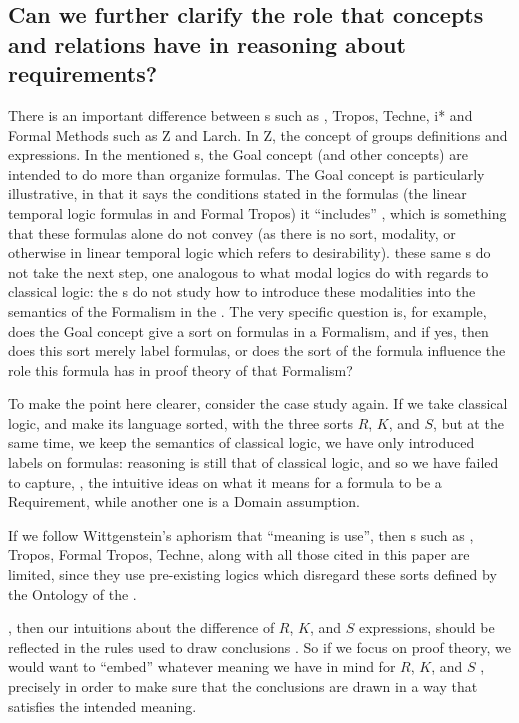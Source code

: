 \documentclass[10pt, final, conference, compsocconf]{IEEEtran}
\begin{document}
\subsection{Can we further clarify the role that concepts and relations have in reasoning about requirements?}\label{s:challenges:meaning-is-use}
There is an important difference between s such as , Tropos, Techne, i* and Formal Methods such as Z and Larch. In Z, the concept of  groups definitions and expressions. In the mentioned s, the Goal concept (and other concepts) are intended to do more than organize formulas. The Goal concept is particularly illustrative, in that it says the conditions stated in the formulas (the linear temporal logic formulas in  and Formal Tropos) it ``includes'' , which is something that these formulas alone do not convey (as there is no sort, modality, or otherwise in linear temporal logic which refers to desirability).  these same s do not take the next step, one analogous to what modal logics do with regards to classical logic: the s do not study how to introduce these modalities into the semantics of the Formalism in the . The very specific question is, for example, does the Goal concept give a sort on formulas in a Formalism, and if yes, then does this sort merely label formulas, or does the sort of the formula influence the role this formula has in proof theory of that Formalism? 

To make the point here clearer, consider the case study again. If we take classical logic, and make its language sorted, with the three sorts $R$, $K$, and $S$, but at the same time, we keep the semantics of classical logic, we have only introduced labels on formulas: reasoning is still that of classical logic, and so we have failed to capture, , the intuitive ideas on what it means for a formula to be a Requirement, while another one is a Domain assumption. 

If we follow Wittgenstein's aphorism that ``meaning is use'', then s such as , Tropos, Formal Tropos, Techne, along with all those cited in this paper are limited, since they use pre-existing logics which disregard these sorts defined by the Ontology of the . 

, then our intuitions about the difference   of $R$, $K$, and $S$ expressions, should be reflected in the rules used to draw conclusions . So if we focus on proof theory, we would want to ``embed'' whatever meaning we have in mind for $R$, $K$, and $S$ , precisely in order to make sure that the conclusions are drawn in a way that satisfies the intended meaning. 
\end{document}

